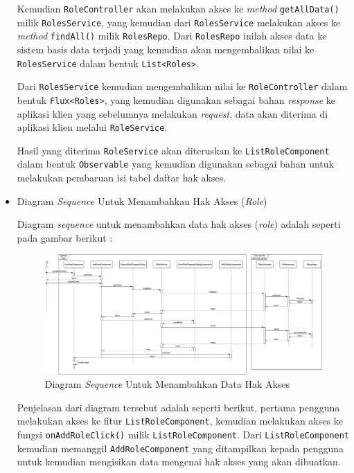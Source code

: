 \documentclass[pdftex,12pt, oneside]{article}
\begin{document}
\begin{itemize}
	Kemudian \texttt{RoleController} akan melakukan akses ke \textit{method} \texttt{getAllData()} milik \texttt{RolesService}, yang kemudian dari \texttt{RolesService} melakukan akses ke \textit{method} \texttt{findAll()} milik \texttt{RolesRepo}. Dari \texttt{RolesRepo} inilah akses data ke sistem basis data terjadi yang kemudian akan mengembalikan nilai ke \texttt{RolesService} dalam bentuk \texttt{List<Roles>}.
	
	Dari \texttt{RolesService} kemudian mengembalikan nilai ke \texttt{RoleController} dalam bentuk \texttt{Flux<Roles>}, yang kemudian digunakan sebagai bahan \textit{response} ke aplikasi klien yang sebelumnya melakukan \textit{request}, data akan diterima di aplikasi klien melalui \texttt{RoleService}.
	
	Hasil yang diterima \texttt{RoleService} akan diteruskan ke \texttt{ListRoleComponent} dalam bentuk \texttt{Observable} yang kemudian digunakan sebagai bahan untuk melakukan pembaruan isi tabel daftar hak akses.
	
	\item Diagram \textit{Sequence} Untuk Menambahkan Hak Akses (\textit{Role})
	
	Diagram \textit{sequence} untuk menambahkan data hak akses (\textit{role}) adalah seperti pada gambar berikut :
	
	\begin{figure}[H]
		\centering
		\includegraphics[width=1\textwidth]{./resources/seq-add-role}
		\caption{Diagram \textit{Sequence} Untuk Menambahkan Data Hak Akses}
		\label{fig:seq-add-role}
	\end{figure}	
	
	Penjelasan dari diagram tersebut adalah seperti berikut, pertama pengguna melakukan akses ke fitur \texttt{ListRoleComponent}, kemudian melakukan akses ke fungsi \texttt{onAddRoleClick()} milik \texttt{ListRoleComponent}. Dari \texttt{ListRoleComponent} kemudian memanggil \texttt{AddRoleComponent} yang ditampilkan kepada pengguna untuk kemudian mengisikan data mengenai hak akses yang akan dibuatkan.
	

\end{itemize}
\end{document}
